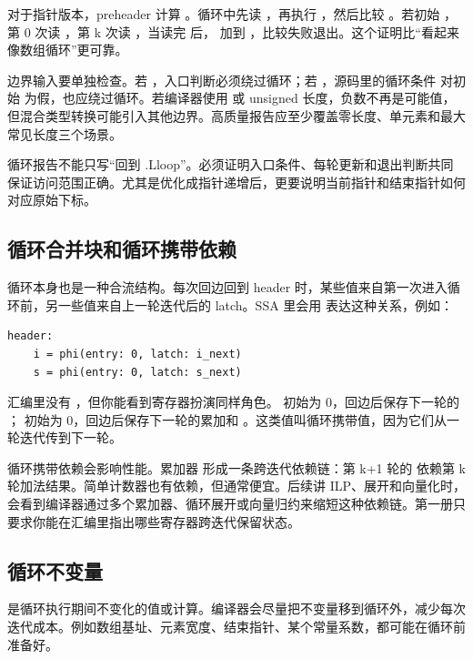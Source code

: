 对于指针版本，preheader 计算 。循环中先读 ，再执行 ，然后比较 。若初始 ，第 0 次读 ，第 k 次读 ，当读完  后， 加到 ，比较失败退出。这个证明比“看起来像数组循环”更可靠。

边界输入要单独检查。若 ，入口判断必须绕过循环；若 ，源码里的循环条件  对初始  为假，也应绕过循环。若编译器使用  或 unsigned 长度，负数不再是可能值，但混合类型转换可能引入其他边界。高质量报告应至少覆盖零长度、单元素和最大常见长度三个场景。

\begin{warningbox}
循环报告不能只写“回到 .Lloop”。必须证明入口条件、每轮更新和退出判断共同保证访问范围正确。尤其是优化成指针递增后，更要说明当前指针和结束指针如何对应原始下标。
\end{warningbox}

\subsection{循环合并块和循环携带依赖}

循环本身也是一种合流结构。每次回边回到 header 时，某些值来自第一次进入循环前，另一些值来自上一轮迭代后的 latch。SSA 里会用  表达这种关系，例如：

\begin{lstlisting}
header:
    i = phi(entry: 0, latch: i_next)
    s = phi(entry: 0, latch: s_next)
\end{lstlisting}

汇编里没有 ，但你能看到寄存器扮演同样角色。 初始为 0，回边后保存下一轮的 ； 初始为 0，回边后保存下一轮的累加和 。这类值叫循环携带值，因为它们从一轮迭代传到下一轮。

循环携带依赖会影响性能。累加器  形成一条跨迭代依赖链：第 k+1 轮的  依赖第 k 轮加法结果。简单计数器也有依赖，但通常便宜。后续讲 ILP、展开和向量化时，会看到编译器通过多个累加器、循环展开或向量归约来缩短这种依赖链。第一册只要求你能在汇编里指出哪些寄存器跨迭代保留状态。

\subsection{循环不变量}

 是循环执行期间不变化的值或计算。编译器会尽量把不变量移到循环外，减少每次迭代成本。例如数组基址、元素宽度、结束指针、某个常量系数，都可能在循环前准备好。

